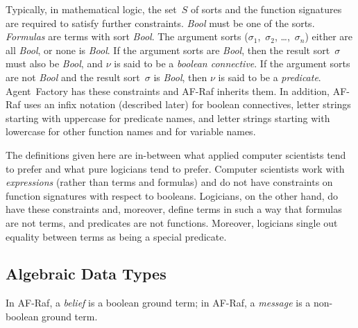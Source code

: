 \documentclass[a4paper,12pt,oneside,fleqn]{book} %
\newcommand{\rg}[1]{\marginpar{\tiny\raggedright\textcolor{blue}{\bf rg:} #1}}
\renewcommand{\rg}{}
\begin{document}
{Typically, in mathematical logic, the set~$S$ of sorts and the function
signatures are required to satisfy further constraints. \textit{Bool} must
be one of the sorts. \emph{Formulas} are terms with sort \textit{Bool}.
The argument sorts ($\sigma_1$,~$\sigma_2$, \dots,~$\sigma_n$) either are
all \textit{Bool}, or none is \textit{Bool}.  If the argument sorts are
\textit{Bool}, then the result sort~$\sigma$ must also be \textit{Bool},
and $\nu$ is said to be a \emph{boolean connective}.  If the argument sorts
are not \textit{Bool} and the result sort~$\sigma$ is \textit{Bool}, then
$\nu$ is said to be a \emph{predicate}.  Agent~Factory has these
constraints and AF-Raf inherits them. In addition, AF-Raf uses an infix
notation (described later) for boolean connectives, letter strings starting
with uppercase for predicate names, and letter strings starting with
lowercase for other function names and for variable names.

\begin{remark}
The definitions given here are in-between what applied computer scientists
tend to prefer and what pure logicians tend to prefer.  Computer scientists
work with \emph{expressions} (rather than terms and formulas) and do not
have constraints on function signatures with respect to booleans.
Logicians, on the other hand, do have these constraints and, moreover,
define terms in such a way that formulas are not terms, and predicates are
not functions. Moreover, logicians single out equality between terms as
being a special predicate.
\end{remark}

\subsection{Algebraic Data Types} %

In AF-Raf, a \emph{belief} is a boolean ground term; in AF-Raf, a
\emph{message} is a non-boolean ground term.

}
\end{document}

